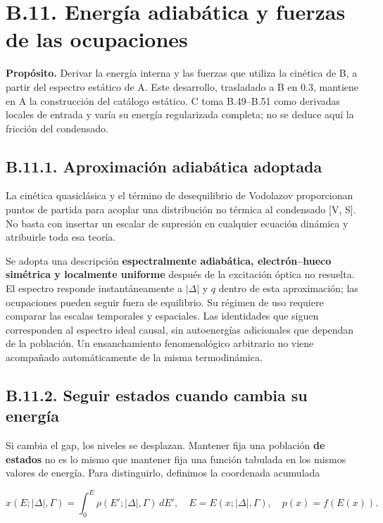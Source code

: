 \documentclass[
  spanish,
  10pt,
  a4paper,
]{article}
\begin{document}
\section{B.11. Energía adiabática y fuerzas de las
ocupaciones}\label{b.11.-energuxeda-adiabuxe1tica-y-fuerzas-de-las-ocupaciones}

\textbf{Propósito.} Derivar la energía interna y las fuerzas que utiliza
la cinética de B, a partir del espectro estático de A. Este desarrollo,
trasladado a B en 0.3, mantiene en A la construcción del catálogo
estático. C toma B.49--B.51 como derivadas locales de entrada y varía su
energía regularizada completa; no se deduce aquí la fricción del
condensado.

\subsection{B.11.1. Aproximación adiabática
adoptada}\label{b.11.1.-aproximaciuxf3n-adiabuxe1tica-adoptada}

La cinética quasiclásica y el término de desequilibrio de Vodolazov
proporcionan puntos de partida para acoplar una distribución no térmica
al condensado {[}V, S{]}. No basta con insertar un escalar de supresión
en cualquier ecuación dinámica y atribuirle toda esa teoría.

Se adopta una descripción \textbf{espectralmente adiabática,
electrón--hueco simétrica y localmente uniforme} después de la
excitación óptica no resuelta. El espectro responde instantáneamente a
\(|\Delta|\) y \(q\) dentro de esta aproximación; las ocupaciones pueden
seguir fuera de equilibrio. Su régimen de uso requiere comparar las
escalas temporales y espaciales. Las identidades que siguen corresponden
al espectro ideal causal, sin autoenergías adicionales que dependan de
la población. Un ensanchamiento fenomenológico arbitrario no viene
acompañado automáticamente de la misma termodinámica.

\subsection{B.11.2. Seguir estados cuando cambia su
energía}\label{b.11.2.-seguir-estados-cuando-cambia-su-energuxeda}

Si cambia el gap, los niveles se desplazan. Mantener fija una población
\textbf{de estados} no es lo mismo que mantener fija una función
tabulada en los mismos valores de energía. Para distinguirlo, definimos
la coordenada acumulada

\[
x(E;|\Delta|,\Gamma)=\int_0^E\rho(E';|\Delta|,\Gamma)\,dE',
\quad E=E(x;|\Delta|,\Gamma),\quad p(x)=f(E(x)).
\tag{B.43}
\]
\end{document}
